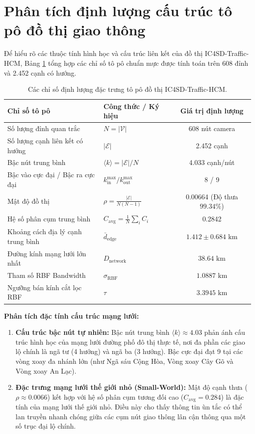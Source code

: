 \section{Phân tích định lượng cấu trúc tô pô đồ thị giao thông}
\label{sec:phan_tich_to_po}

Để hiểu rõ các thuộc tính hình học và cấu trúc liên kết của đồ thị IC4SD-Traffic-HCM, Bảng \ref{tab:topo_dothi_chap3} tổng hợp các chỉ số tô pô chuẩn mực được tính toán trên 608 đỉnh và 2.452 cạnh có hướng.

\begin{table}[htbp]
\centering
\caption{Các chỉ số định lượng đặc trưng tô pô đồ thị IC4SD-Traffic-HCM.}
\label{tab:topo_dothi_chap3}
\small
\begin{tabularx}{\textwidth}{l X c}
\toprule
\textbf{Chỉ số tô pô} & \textbf{Công thức / Ký hiệu} & \textbf{Giá trị định lượng} \\
\midrule
Số lượng đỉnh quan trắc & $N = |\mathcal{V}|$ & 608 nút camera \\
Số lượng cạnh liên kết có hướng & $|\mathcal{E}|$ & 2.452 cạnh \\
Bậc nút trung bình & $\langle k \rangle = |\mathcal{E}| / N$ & 4.033 cạnh/nút \\
Bậc vào cực đại / Bậc ra cực đại & $k_{\text{in}}^{\max} / k_{\text{out}}^{\max}$ & 8 / 9 \\
Mật độ đồ thị & $\rho = \frac{|\mathcal{E}|}{N(N-1)}$ & 0.00664 (Độ thưa $99.34\%$) \\
Hệ số phân cụm trung bình & $C_{\text{avg}} = \frac{1}{N} \sum_i C_i$ & 0.2842 \\
Khoảng cách địa lý cạnh trung bình & $\bar{d}_{\text{edge}}$ & $1.412 \pm 0.684\text{ km}$ \\
Đường kính mạng lưới lớn nhất & $D_{\text{network}}$ & $38.64\text{ km}$ \\
Tham số RBF Bandwidth & $\sigma_{\mathrm{RBF}}$ & $1.0887\text{ km}$ \\
Ngưỡng bán kính cắt lọc RBF & $\tau$ & $3.3945\text{ km}$ \\
\bottomrule
\end{tabularx}
\end{table}

\textbf{Phân tích đặc tính cấu trúc mạng lưới:}
\begin{enumerate}
    \item \textbf{Cấu trúc bậc nút tự nhiên:} Bậc nút trung bình $\langle k \rangle \approx 4.03$ phản ánh cấu trúc hình học của mạng lưới đường phố đô thị thực tế, nơi đa phần các giao lộ chính là ngã tư (4 hướng) và ngã ba (3 hướng). Bậc cực đại đạt 9 tại các vòng xoay đa nhánh lớn (như Ngã sáu Cộng Hòa, Vòng xoay Cây Gõ và Vòng xoay An Lạc).
    \item \textbf{Đặc trưng mạng lưới thế giới nhỏ (Small-World):} Mật độ cạnh thưa ($\rho \approx 0.0066$) kết hợp với hệ số phân cụm tương đối cao ($C_{\text{avg}} = 0.284$) là đặc tính của mạng lưới thế giới nhỏ. Điều này cho thấy thông tin ùn tắc có thể lan truyền nhanh chóng giữa các cụm nút giao thông lân cận thông qua một số trục đại lộ chính.
\end{enumerate}

